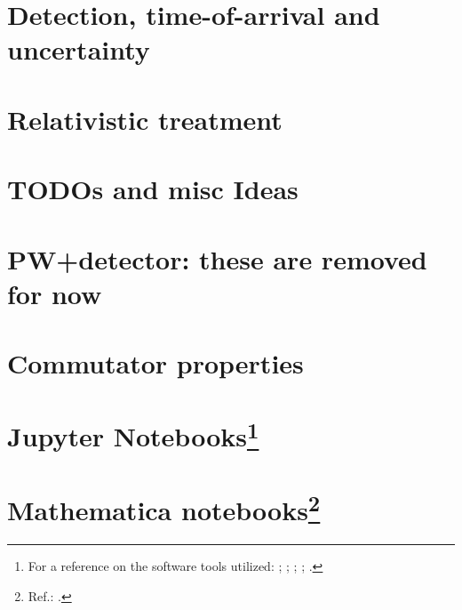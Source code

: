 \chapter{Detection, time-of-arrival and uncertainty}




\chapter{Relativistic treatment}


\iftodo
  \chapter{TODOs and misc Ideas}
  
  \chapter{PW+detector: these are removed for now}
  
\fi

\appendix

\chapter{Commutator properties}


\chapter[Jupyter Notebooks]{Jupyter Notebooks\footnote{
  For a reference on the software tools utilized:
  \cite{comp:scipy};
  \cite{comp:sympy};
  \cite{comp:jupyter};
  \cite{comp:matplotlib};
  \cite{comp:numpy}.
}}



%


\chapter[Mathematica notebooks]{Mathematica notebooks\footnote{
  Ref.: \cite{Wolfram}.
}}



\printbibliography[heading=bibintoc]


